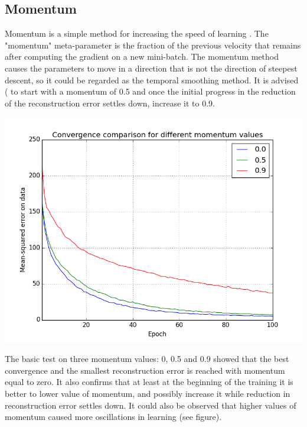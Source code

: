\documentclass[a4paper]{scrartcl}
\begin{document}
\subsection{Momentum}
Momentum is a simple method for increasing the speed of learning \cite{Hinton}. The "momentum" meta-parameter is the fraction of the previous velocity that remains after computing the gradient on a new mini-batch. The momentum method causes the parameters to move in a direction that is not the direction of steepest descent, so it could be regarded as the temporal smoothing method. It is advised (\cite{Hinton} to start with a momentum of 0.5 and once the initial progress in the reduction of the reconstruction error settles down, increase it to 0.9. 
\begin{center}
\includegraphics[width=14cm]{images/momentum.png}
\end{center}
The basic test on three momentum values: 0, 0.5 and 0.9 showed that the best convergence and the smallest reconstruction error is reached with momentum equal to zero. It also confirms that at least at the beginning of the training it is better to lower value of momentum, and possibly increase it while reduction in reconstruction error settles down. It could also be observed that higher values of momentum caused more oscillations in learning (see figure).
\end{document}
